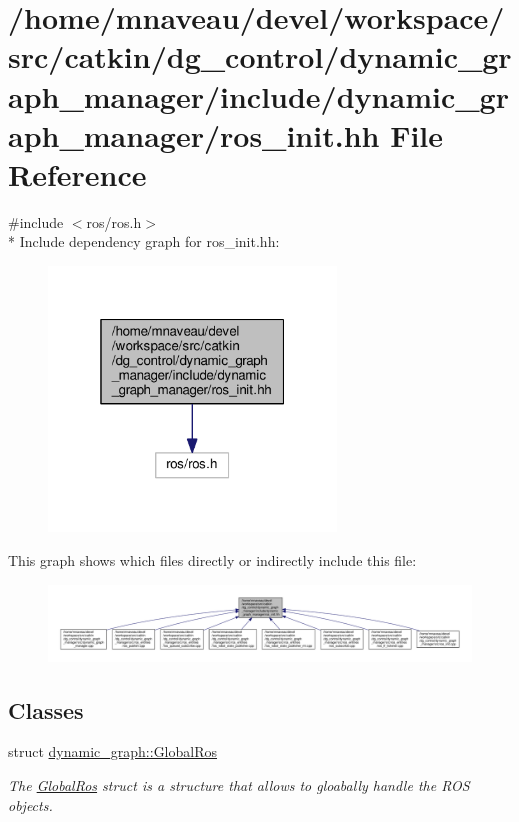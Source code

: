 \hypertarget{ros__init_8hh}{}\section{/home/mnaveau/devel/workspace/src/catkin/dg\+\_\+control/dynamic\+\_\+graph\+\_\+manager/include/dynamic\+\_\+graph\+\_\+manager/ros\+\_\+init.hh File Reference}
\label{ros__init_8hh}
{\ttfamily \#include $<$ros/ros.\+h$>$}\\*
Include dependency graph for ros\+\_\+init.\+hh\+:\nopagebreak
\begin{figure}[H]
\begin{center}
\leavevmode
\includegraphics[width=217pt]{ros__init_8hh__incl}
\end{center}
\end{figure}
This graph shows which files directly or indirectly include this file\+:\nopagebreak
\begin{figure}[H]
\begin{center}
\leavevmode
\includegraphics[width=350pt]{ros__init_8hh__dep__incl}
\end{center}
\end{figure}
\subsection*{Classes}
\begin{DoxyCompactItemize}
\item 
struct \hyperlink{structdynamic__graph_1_1GlobalRos}{dynamic\+\_\+graph\+::\+Global\+Ros}
\begin{DoxyCompactList}\small\item\em The \hyperlink{structdynamic__graph_1_1GlobalRos}{Global\+Ros} struct is a structure that allows to gloabally handle the R\+OS objects. \end{DoxyCompactList}\end{DoxyCompactItemize}
